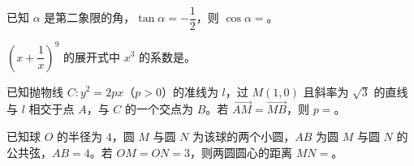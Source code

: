 \begin{question}
已知 $\alpha$ 是第二象限的角，$\tan\alpha=-\dfrac12$，则 $\cos\alpha=$\gkblank{}。

\end{question}
\begin{question}
$\left(x+\dfrac1x\right)^9$ 的展开式中 $x^3$ 的系数是\gkblank{}。

\end{question}
\begin{question}
已知抛物线 $C:y^2=2px$（$p>0$）的准线为 $l$，过 $M(1,0)$ 且斜率为 $\sqrt3$ 的直线与 $l$ 相交于点 $A$，与 $C$ 的一个交点为 $B$。若 $\overrightarrow{AM}=\overrightarrow{MB}$，则 $p=$\gkblank{}。

\end{question}
\begin{question}
已知球 $O$ 的半径为 $4$，圆 $M$ 与圆 $N$ 为该球的两个小圆，$AB$ 为圆 $M$ 与圆 $N$ 的公共弦，$AB=4$。若 $OM=ON=3$，则两圆圆心的距离 $MN=$\gkblank{}。

\end{question}

